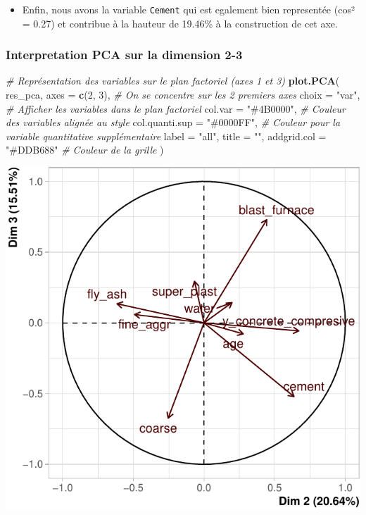 \documentclass[
  12pt,
]{article}
\newenvironment{Shaded}{\begin{snugshade}}{\end{snugshade}}
\newcommand{\AttributeTok}[1]{\textcolor[rgb]{0.13,0.29,0.53}{#1}}
\newcommand{\CommentTok}[1]{\textcolor[rgb]{0.56,0.35,0.01}{\textit{#1}}}
\newcommand{\DecValTok}[1]{\textcolor[rgb]{0.00,0.00,0.81}{#1}}
\newcommand{\FunctionTok}[1]{\textcolor[rgb]{0.13,0.29,0.53}{\textbf{#1}}}
\newcommand{\NormalTok}[1]{#1}
\newcommand{\StringTok}[1]{\textcolor[rgb]{0.31,0.60,0.02}{#1}}
\providecommand{\tightlist}{%
  \setlength{\itemsep}{0pt}\setlength{\parskip}{0pt}}
\begin{document}
\begin{itemize}
\tightlist
\item
  Enfin, nous avons la variable \texttt{Cement} qui est egalement bien
  representée (cos² = 0.27) et contribue à la hauteur de 19.46\% à la
  construction de cet axe.
\end{itemize}

\subsubsection{Interpretation PCA sur la dimension
2-3}\label{interpretation-pca-sur-la-dimension-2-3}

\begin{Shaded}
\begin{Highlighting}[]
\CommentTok{\# Représentation des variables sur le plan factoriel (axes 1 et 3)}
\FunctionTok{plot.PCA}\NormalTok{(}
\NormalTok{  res\_pca,}
  \AttributeTok{axes =} \FunctionTok{c}\NormalTok{(}\DecValTok{2}\NormalTok{, }\DecValTok{3}\NormalTok{),             }\CommentTok{\# On se concentre sur les 2 premiers axes}
  \AttributeTok{choix =} \StringTok{"var"}\NormalTok{,              }\CommentTok{\# Afficher les variables dans le plan factoriel}
  \AttributeTok{col.var =} \StringTok{"\#4B0000"}\NormalTok{,        }\CommentTok{\# Couleur des variables alignée au style}
  \AttributeTok{col.quanti.sup =} \StringTok{"\#0000FF"}\NormalTok{, }\CommentTok{\# Couleur pour la variable quantitative supplémentaire}
  \AttributeTok{label =} \StringTok{"all"}\NormalTok{,}
  \AttributeTok{title =} \StringTok{""}\NormalTok{,}
  \AttributeTok{addgrid.col =} \StringTok{"\#DDB688"}     \CommentTok{\# Couleur de la grille}
\NormalTok{)}
\end{Highlighting}
\end{Shaded}

\begin{center}\includegraphics{rmd_final_files/figure-latex/unnamed-chunk-35-1} \end{center}
\end{document}
